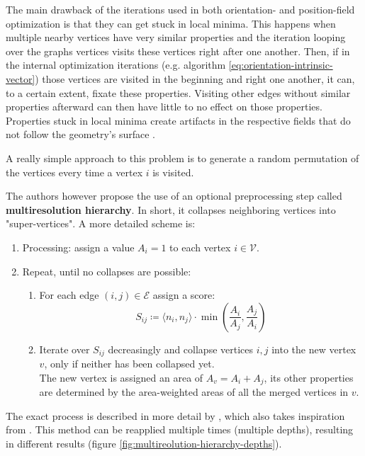 \documentclass{ACGSeminar}
\begin{document}
The main drawback of the iterations used in both orientation- and position-field optimization is that they can get stuck in local minima. This happens when multiple nearby vertices have very similar properties and the iteration looping over the graphs vertices visits these vertices right after one another. Then, if in the internal optimization iterations (e.g. algorithm \eqref{eq:orientation-intrinsic-vector}) those vertices are visited in the beginning and right one another, it can, to a certain extent, fixate these properties. Visiting other edges without similar properties afterward can then have little to no effect on those properties. Properties stuck in local minima create artifacts in the respective fields that do not follow the geometry's surface \cite{jakob2015instant}.\bigskip

A really simple approach to this problem is to generate a random permutation of the vertices every time a vertex $i$ is visited.

The authors however propose the use of an optional preprocessing step called \textbf{multiresolution hierarchy}. In short, it collapses neighboring vertices into "super-vertices". A more detailed scheme is:
\begin{enumerate}
	\item	Processing: assign a value $A_i = 1$ to each vertex $i \in \mathcal{V}$.
	\item	Repeat, until no collapses are possible:
			\begin{enumerate}
				\item	For each edge $(i,j) \in \mathcal{E}$ assign a score:
						\begin{equation*}
							S_{ij} \coloneqq \langle n_i, n_j \rangle \cdot \min(\frac{A_i}{A_j}, \frac{A_j}{A_i})
						\end{equation*}
				\item	Iterate over $S_{ij}$ decreasingly and collapse vertices $i,j$ into the new vertex $v$, only if neither has been collapsed yet.\\
						The new vertex is assigned an area of $A_v = A_i + A_j$, its other properties are determined by the area-weighted areas of all the merged vertices in $v$.
			\end{enumerate}
\end{enumerate}
The exact process is described in more detail by \cite{jakob2015instant}, which also takes inspiration from \cite{botsch2006primo}. This method can be reapplied multiple times (multiple depths), resulting in different results (figure \ref{fig:multireolution-hierarchy-depths}).
\end{document}
